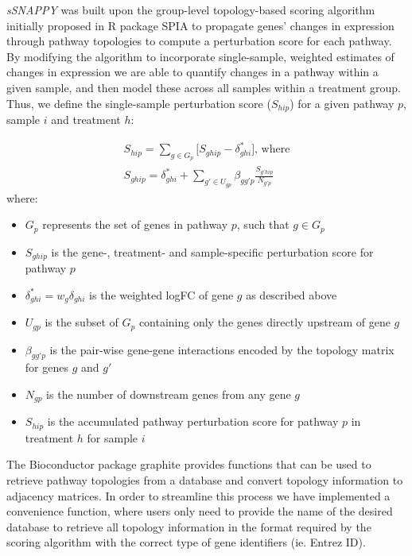 \documentclass[9pt,a4paper,]{extarticle}
\begin{document}
\emph{sSNAPPY} was built upon the group-level topology-based scoring algorithm initially proposed in R package SPIA\citep{Tarca2009} to propagate genes' changes in expression through pathway topologies to compute a perturbation score for each pathway.
By modifying the algorithm to incorporate single-sample, weighted estimates of changes in expression we are able to quantify changes in a pathway within a given sample, and then model these across all samples within a treatment group.
Thus, we define the single-sample perturbation score (\(S_{hip}\)) for a given pathway \(p\), sample \(i\) and treatment \(h\):

\[
\begin{aligned}
S_{hip} = \sum_{g \in G_p} \lbrack S_{ghip} - \delta_{ghi}^*\rbrack \text{, where} \\
S_{ghip} = \delta_{ghi}^* + \sum_{g' \in U_{gp}} \beta_{gg'p} \frac{S_{g'hip}}{N_{g'p}} 
\end{aligned}
\]
where:

\begin{itemize}
\item
  \(G_p\) represents the set of genes in pathway \(p\), such that \(g \in G_p\)
\item
  \(S_{ghip}\) is the gene-, treatment- and sample-specific perturbation score for pathway \(p\)
\item
  \(\delta_{ghi}^* = w_g\delta_{ghi}\) is the weighted logFC of gene \(g\) as described above
\item
  \(U_{gp}\) is the subset of \(G_p\) containing only the genes directly upstream of gene \(g\)
\item
  \(\beta_{gg'p}\) is the pair-wise gene-gene interactions\citep{Tarca2009} encoded by the topology matrix for genes \(g\) and \(g'\)
\item
  \(N_{gp}\) is the number of downstream genes from any gene \(g\)
\item
  \(S_{hip}\) is the accumulated pathway perturbation score for pathway \(p\) in treatment \(h\) for sample \(i\)
\end{itemize}

The Bioconductor package graphite\citep{Sales2012} provides functions that can be used to retrieve pathway topologies from a database and convert topology information to adjacency matrices.
In order to streamline this process we have implemented a convenience function, where users only need to provide the name of the desired database to retrieve all topology information in the format required by the scoring algorithm with the correct type of gene identifiers (ie. Entrez ID).
\end{document}
